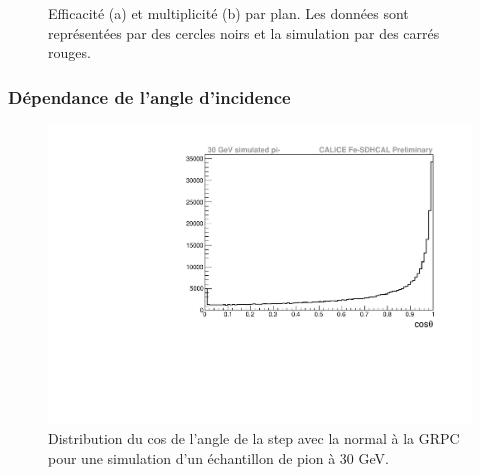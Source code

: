 \begin{figure}[!ht]
  \caption{Efficacité (a) et multiplicité (b) par plan. Les données sont représentées par des cercles noirs et la simulation par des carrés rouges.\label{fig.eff_mul_layer}}
\end{figure}


\subsubsection{Dépendance de l'angle d'incidence}

\begin{figure}[!ht]
  \begin{center}
    \includegraphics[width=.8\textwidth]{Digitizer/figs/costhetaPI30.pdf}
    \caption{Distribution du cos de l'angle de la step avec la normal à la GRPC pour une simulation d'un échantillon de pion à 30 GeV.}
    \label{fig.g4list}
  \end{center}
\end{figure}

